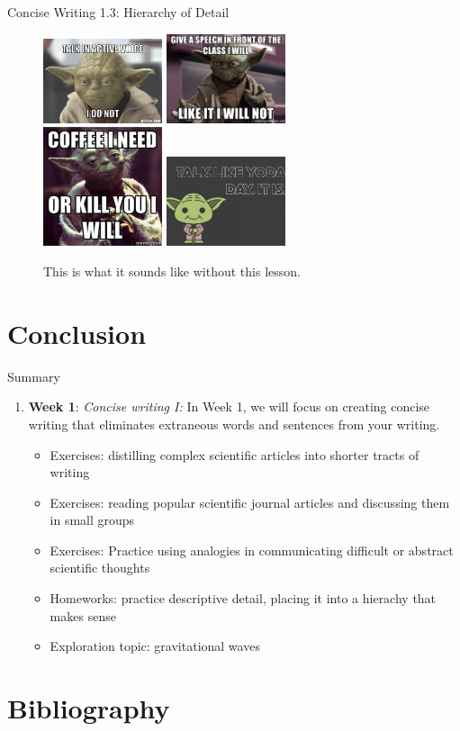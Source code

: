 \documentclass{beamer}
\begin{document}
\begin{frame}{Concise Writing 1.3: Hierarchy of Detail}
\begin{figure}
\includegraphics[width=3.5cm]{figures/yoda1.jpg}
\includegraphics[width=3.5cm]{figures/yoda2.jpg} \\
\includegraphics[width=3.5cm]{figures/yoda3.jpg}
\includegraphics[width=3.5cm]{figures/yoda4.jpg}
\caption{\label{fig:yodas} This is what it sounds like without this lesson.}
\end{figure}
\end{frame}

\section{Conclusion}

\begin{frame}{Summary}
\begin{enumerate}
\item \textbf{Week 1}: \textit{Concise writing I:} In Week 1, we will focus on creating concise writing that eliminates extraneous words and sentences from your writing.
\begin{itemize}
\item Exercises: distilling complex scientific articles into shorter tracts of writing
\item Exercises: reading popular scientific journal articles and discussing them in small groups
\item Exercises: Practice using analogies in communicating difficult or abstract scientific thoughts
\item Homeworks: practice descriptive detail, placing it into a hierachy that makes sense
\item Exploration topic: gravitational waves
\end{itemize}
\end{enumerate}
\end{frame}


\section{Bibliography}


\end{document}
